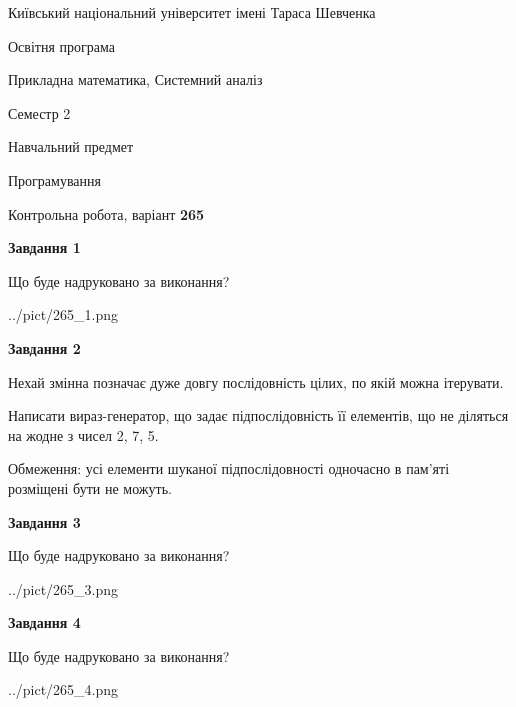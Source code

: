 \documentclass[12pt, ukrainian]{article}
\begin{document}
{{\begin {small}\par
{ \center  Київський національний університет імені Тараса Шевченка \par}
{\parbox {5 cm}{Освітня програма \hfill}{\parbox {8 cm}{Прикладна математика, Системний аналіз \hfill}}\parbox {5 cm}{\hfill Семестр 2}}\par
{\parbox {5 cm} {Навчальний предмет \hfill}\parbox {7 cm}{Програмування \hfill}\parbox {6cm}{\hfill}\par}\vspace{-7pt} \end{small}}{\center Контрольна робота, варіант  \No \textbf
{ 265 }\par}}
{
\begin {large}
{\begin {center}\textbf{Завдання 1}\end {center}}\par
Що буде надруковано за виконання?\par\par
\begin{center}
	{../pict/265_1.png}
\end{center}
\newpage

{\begin {center}\textbf{Завдання 2}\end {center}}\par
Нехай змінна  позначає дуже довгу послідовність цілих, по якій можна ітерувати.

Написати вираз-генератор, що задає підпослідовність її елементів, що не діляться на жодне з чисел 2, 7, 5.

Обмеження: усі елементи шуканої підпослідовності одночасно в пам'яті розміщені бути не можуть.\par
\newpage

{\begin {center}\textbf{Завдання 3}\end {center}}\par
Що буде надруковано за виконання?\par
\begin{center}
	{../pict/265_3.png}
\end{center}
\newpage

{\begin {center}\textbf{Завдання 4}\end {center}}\par
Що буде надруковано за виконання?\par
\begin{center}
	{../pict/265_4.png}
\end{center}
\newpage


\end{large}}
\end{document}
